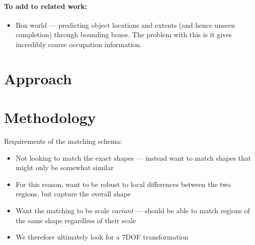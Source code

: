 \documentclass[10pt,a4paper, twocolumn]{article}
\begin{document}
\paragraph{To add to related work:}
\begin{itemize}
\item Box world --- predicting object locations and extents (and hence unseen completion) through bounding boxes. 
The problem with this is it gives incredibly coarse occupation information.
\end{itemize}


\section{Approach}





\section{Methodology}

Requirements of the matching schema:
\begin{itemize}
\item Not looking to match the exact shapes --- instead want to match shapes that might only be somewhat similar
\item For this reason, want to be robust to local differences between the two regions, but capture the overall shape
\item Want the matching to be scale \emph{variant} --- should be able to match regions of the same shape regardless of their scale 
\item We therefore ultimately look for a 7DOF transformation
\end{itemize}
\end{document}

